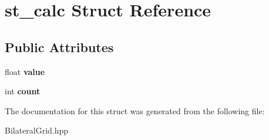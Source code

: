 \hypertarget{structst__calc}{}\section{st\+\_\+calc Struct Reference}
\label{structst__calc}
\subsection*{Public Attributes}
\begin{DoxyCompactItemize}
\item 
float {\bfseries value}\hypertarget{structst__calc_a03d8bbce0d053feeae285529e9977098}{}\label{structst__calc_a03d8bbce0d053feeae285529e9977098}

\item 
int {\bfseries count}\hypertarget{structst__calc_afab400d02a26c68b1e3f5afb5636c281}{}\label{structst__calc_afab400d02a26c68b1e3f5afb5636c281}

\end{DoxyCompactItemize}


The documentation for this struct was generated from the following file\+:\begin{DoxyCompactItemize}
\item 
Bilateral\+Grid.\+hpp\end{DoxyCompactItemize}
